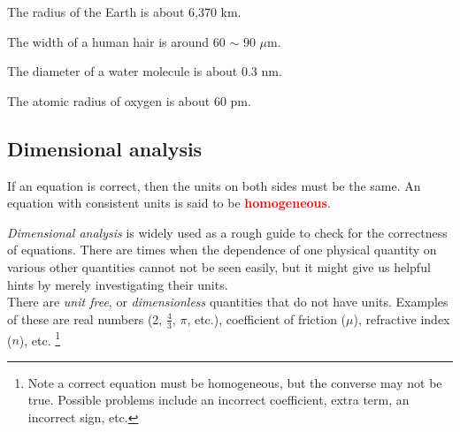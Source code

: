 \documentclass[a4paper,12pt]{book}
\newcounter{example}[chapter]
\renewcommand{\theexample}{\arabic{chapter}.\arabic{example}}
\newcommand{\example}[1]{%
	\refstepcounter{example}
	\noindent {\textcolor{cyan}{\textsf{\textbf{Example \theexample }}} \hspace*{1pt} #1 %
	} \vspace{5pt}}
\newenvironment{ilight}
  {\centering
  	\vspace*{6pt}
  	\begin{tcolorbox}[colframe=Gray,colback=LightGrey!15]
  \setlength{\baselineskip}{\baselineskip}%
  }
  {\end{tcolorbox}\vspace*{-4pt}}
\newcommand{\keypoint}[1]{\textbf{\textcolor{red}{#1}}}
\newcommand{\mps}{\,\text{m\,s}^{-1}}
\newcommand{\mpss}{\,\text{m\,s}^{-2}}
\newcommand{\keypoint}[1]{\textbf{\textcolor{red}{#1}}}
\begin{document}
	The radius of the Earth is about 6,370 km.
	
	The width of a human hair is around 60 $\sim$ 90 $\mu$m.
	
	The diameter of a water molecule is about 0.3 nm.
	
	The atomic radius of oxygen is about 60 pm. 

\subsection{Dimensional analysis}

\begin{ilight}
	If an equation is correct, then the units on both sides must be the same. An equation with consistent units is said to be \keypoint{homogeneous}.
\end{ilight}

\emph{Dimensional analysis} is widely used as a rough guide to check for the correctness of equations. There are times when the dependence of one physical quantity on various other quantities cannot not be seen easily, but it might give us helpful hints by merely investigating their units.\\
There are \emph{unit free}, or \emph{dimensionless} quantities that do not have units. Examples of these are real numbers (2, $\frac{4}{3}$, $\pi$, etc.), coefficient of friction ($\mu$), refractive index ($n$), etc. \footnote{Note a correct equation must be homogeneous, but the converse may not be true. Possible problems include an incorrect coefficient, extra term, an incorrect sign, etc.}

	

%	
%	
%	
%	
%	
%	
%	
%	
	
\end{document}

